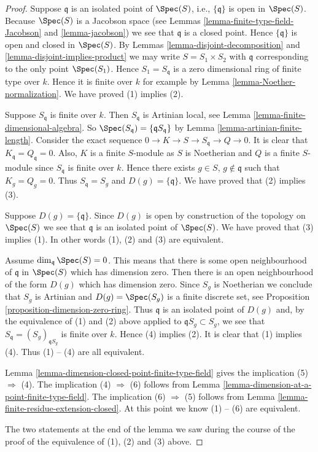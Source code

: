 \begin{proof}
Suppose $\mathfrak q$ is an isolated point of $\Spec(S)$, i.e.,
$\{\mathfrak q\}$ is open in $\Spec(S)$.
Because $\Spec(S)$ is a Jacobson space (see
Lemmas \ref{lemma-finite-type-field-Jacobson} and
\ref{lemma-jacobson})
we see that $\mathfrak q$ is a closed point. Hence
$\{\mathfrak q\}$ is open and closed in $\Spec(S)$.
By
Lemmas \ref{lemma-disjoint-decomposition} and
\ref{lemma-disjoint-implies-product} we may
write $S = S_1 \times S_2$ with $\mathfrak q$
corresponding to the only point $\Spec(S_1)$.
Hence $S_1 = S_{\mathfrak q}$ is a zero dimensional
ring of finite type over $k$. Hence it is finite over $k$
for example by Lemma \ref{lemma-Noether-normalization}.
We have proved (1) implies (2).

\medskip\noindent
Suppose $S_{\mathfrak q}$ is finite over $k$.
Then $S_{\mathfrak q}$ is Artinian local, see
Lemma \ref{lemma-finite-dimensional-algebra}. So
$\Spec(S_{\mathfrak q}) = \{\mathfrak qS_{\mathfrak q}\}$ by
Lemma \ref{lemma-artinian-finite-length}.
Consider the exact sequence $0 \to K \to S \to S_{\mathfrak q}
\to Q \to 0$. It is clear that $K_{\mathfrak q} = Q_{\mathfrak q} = 0$.
Also, $K$ is a finite $S$-module as $S$ is Noetherian and
$Q$ is a finite $S$-module since $S_{\mathfrak q}$ is finite over $k$.
Hence there exists $g \in S$, $g \not \in \mathfrak q$ such that
$K_g = Q_g = 0$. Thus $S_{\mathfrak q} = S_g$ and
$D(g) = \{ \mathfrak q \}$. We have proved that (2) implies (3).

\medskip\noindent
Suppose $D(g) =  \{ \mathfrak q \}$. Since $D(g)$ is open by
construction of the topology on $\Spec(S)$ we see that
$\mathfrak q$ is an isolated point of $\Spec(S)$.
We have proved that (3) implies (1).
In other words (1), (2) and (3) are equivalent.

\medskip\noindent
Assume $\dim_{\mathfrak q} \Spec(S) = 0$. This means that
there is some open neighbourhood of $\mathfrak q$ in $\Spec(S)$
which has dimension zero. Then there is an open neighbourhood of the
form $D(g)$ which has dimension zero. Since $S_g$ is Noetherian
we conclude that $S_g$ is Artinian and
$D(g) = \Spec(S_g)$ is a finite discrete set, see
Proposition \ref{proposition-dimension-zero-ring}.
Thus $\mathfrak q$ is an isolated point of $D(g)$ and,
by the equivalence of (1) and (2) above applied to
$\mathfrak qS_g \subset S_g$, we see that
$S_{\mathfrak q} = (S_g)_{\mathfrak qS_g}$ is finite over $k$.
Hence (4) implies (2). It is clear that (1) implies (4).
Thus (1) -- (4) are all equivalent.

\medskip\noindent
Lemma \ref{lemma-dimension-closed-point-finite-type-field}
gives the implication (5) $\Rightarrow$ (4).
The implication (4) $\Rightarrow$ (6) follows from
Lemma \ref{lemma-dimension-at-a-point-finite-type-field}.
The implication (6) $\Rightarrow$ (5) follows from
Lemma \ref{lemma-finite-residue-extension-closed}.
At this point we know (1) -- (6) are equivalent.

\medskip\noindent
The two statements at the end of the lemma we saw during the
course of the proof of the equivalence of (1), (2) and (3) above.
\end{proof}

